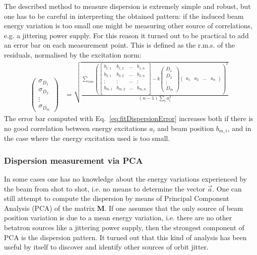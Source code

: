 The described method to measure dispersion is extremely simple and robust, but one has to
be careful in interpreting the obtained pattern: if the induced beam energy variation is
too small one might be measuring other source of correlations, e.g. a jittering power
supply.
For this reason it turned out to be practical to add an error bar on each measurement
point.
This is defined as the r.m.s. of the residuals, normalised by the excitation norm:
%
\begin{align}
\begin{pmatrix}
\sigma_{D_1} \\
\sigma_{D_2} \\
\vdots \\
\sigma_{D_m}
\end{pmatrix}
&=
\sqrt{
\frac{
\sum_{row}
\left(
\begin{bmatrix}
   b_{1,1} & b_{1,2} & \ldots & b_{1,n} \\
   b_{2,1} & b_{2,2} & \ldots & b_{2,n} \\
   \vdots &\vdots &\cdots &\vdots \\
   b_{m,1} & b_{m,2} & \ldots & b_{m,n} \\
\end{bmatrix}
-
k
\begin{pmatrix}
D_1 \\
D_2 \\
\vdots \\
D_m
\end{pmatrix}
%
\begin{pmatrix}
a_1 & a_2 & \ldots & a_n 
\end{pmatrix}
\right)^2
}
{(n - 1) \sum_i{a_i^2}}
}
\label{eq:fitDispersionError}
\end{align}
%
The error bar computed with Eq.~\ref{eq:fitDispersionError} increases both if there is
no good correlation between energy excitations $a_i$ and beam position $b_{m,i}$, and in
the case where the energy excitation used is too small.

\subsubsection{Dispersion measurement via PCA}
%
In some cases one has no knowledge about the energy variations experienced by the beam
from shot to shot, i.e. no means to determine the vector $\vec{a}$.
One can still attempt to compute the dispersion by means of Principal Component Analysis
(PCA) \cite{DBLP:journals/corr/Shlens14, trefethen1997numerical} of the matrix
$\mathbf{M}$. 
If one assumes that the only source of beam position variation is due to a mean energy
variation, i.e. there are no other betatron sources like a jittering power supply, then
the strongest component of PCA is the dispersion pattern.
It turned out that this kind of analysis has been useful by itself to
discover and identify other sources of orbit jitter.

